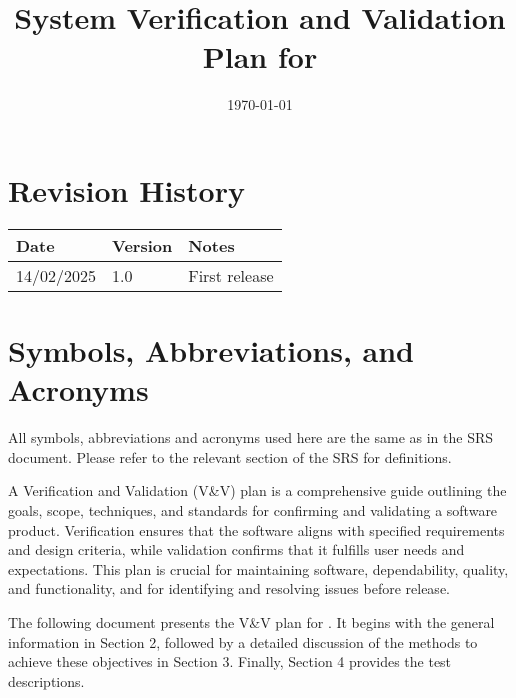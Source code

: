 \documentclass[12pt, titlepage]{article}
\begin{document}
\title{System Verification and Validation Plan for \progname{}} 
\author{\authname}
\date{\today}
	
\maketitle


\section*{Revision History}

\begin{tabularx}{\textwidth}{p{3cm}p{2cm}X}
\toprule {\bf Date} & {\bf Version} & {\bf Notes}\\
\midrule
14/02/2025 & 1.0 & First release\\
\bottomrule
\end{tabularx}


\newpage

\tableofcontents

\listoftables
{}

\listoffigures
{}

\newpage

\section{Symbols, Abbreviations, and Acronyms}

All symbols, abbreviations and acronyms used here are the same as in the SRS document. Please refer to the relevant section of the SRS for definitions. 

\newpage


A Verification and Validation (V\&V) plan is a comprehensive guide outlining the goals, scope, techniques, and standards for confirming and validating a software product. 
Verification ensures that the software aligns with specified requirements and design criteria, while validation confirms that it fulfills user needs and expectations. 
This plan is crucial for maintaining software, dependability, quality, and functionality, and for identifying and resolving issues before release.

The following document presents the V\&V plan for \progname. It begins with the general information in Section 2, followed by a detailed discussion of the methods to achieve these objectives in Section 3. Finally, Section 4 provides the test descriptions.
\end{document}
